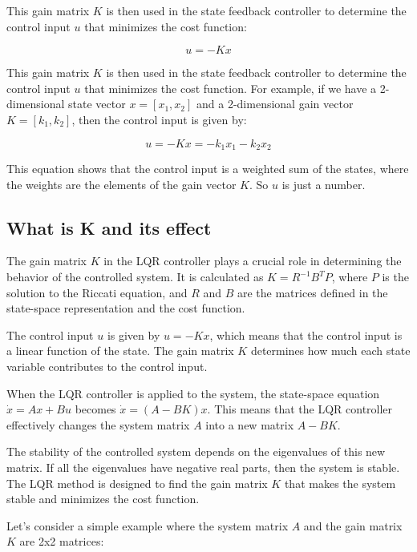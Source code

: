 \documentclass[11pt,twocolumn,twoside,lineno]{pnas-new}
\begin{document}
This gain matrix \(K\) is then used in the state feedback controller to determine the control input \(u\) that minimizes the cost function:

\begin{equation}
u = -Kx
\end{equation}

This gain matrix \(K\) is then used in the state feedback controller to determine the control input \(u\) that minimizes the cost function. For example, if we have a 2-dimensional state vector \(x = [x_1, x_2]\) and a 2-dimensional gain vector \(K = [k_1, k_2]\), then the control input is given by:

\begin{equation}
u = -Kx = -k_1x_1 - k_2x_2
\end{equation}

This equation shows that the control input is a weighted sum of the states, where the weights are the elements of the gain vector \(K\). So $u$ is just a number.

\subsection{What is K and its effect}
The gain matrix \(K\) in the LQR controller plays a crucial role in determining the behavior of the controlled system. It is calculated as \(K = R^{-1}B^TP\), where \(P\) is the solution to the Riccati equation, and \(R\) and \(B\) are the matrices defined in the state-space representation and the cost function.

The control input \(u\) is given by \(u = -Kx\), which means that the control input is a linear function of the state. The gain matrix \(K\) determines how much each state variable contributes to the control input. 

When the LQR controller is applied to the system, the state-space equation \(\dot{x} = Ax + Bu\) becomes \(\dot{x} = (A - BK)x\). This means that the LQR controller effectively changes the system matrix \(A\) into a new matrix \(A - BK\). 

The stability of the controlled system depends on the eigenvalues of this new matrix. If all the eigenvalues have negative real parts, then the system is stable. The LQR method is designed to find the gain matrix \(K\) that makes the system stable and minimizes the cost function.

Let's consider a simple example where the system matrix \(A\) and the gain matrix \(K\) are 2x2 matrices:
\end{document}
